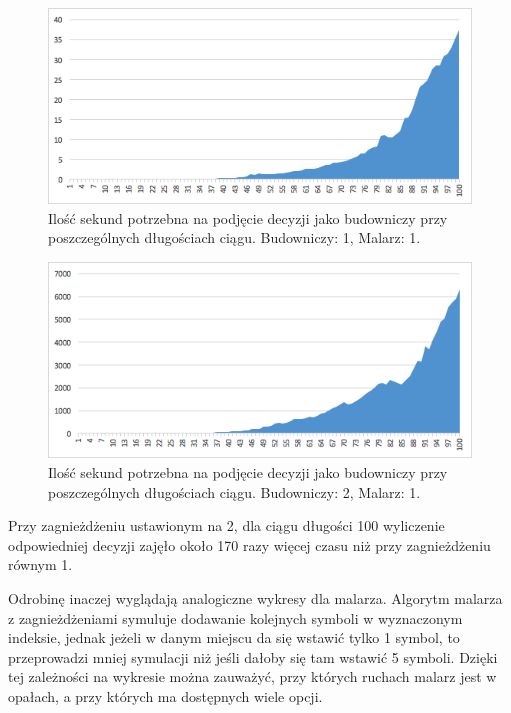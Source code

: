 \documentclass[document]{xmgr}
\begin{document}
\begin{figure}[h]
    \centering
    \includegraphics[scale = 0.7]{images/timeBuilder1Painter1}
    \caption{Ilość sekund potrzebna na podjęcie decyzji jako budowniczy przy poszczególnych długościach ciągu. Budowniczy: 1, Malarz: 1.}
    \label{fig:builder1painter1}
\end{figure}

\begin{figure}[H]
    \centering
    \includegraphics[scale = 0.7]{images/timeBuilder2Painter1}
    \caption{Ilość sekund potrzebna na podjęcie decyzji jako budowniczy przy poszczególnych długościach ciągu. Budowniczy: 2, Malarz: 1.}
    \label{fig:builder2painter1}
\end{figure}

Przy zagnieżdżeniu ustawionym na 2, dla ciągu długości 100 wyliczenie odpowiedniej decyzji zajęło około 170 razy więcej czasu niż przy zagnieżdżeniu równym 1.

Odrobinę inaczej wyglądają analogiczne wykresy dla malarza. Algorytm malarza z zagnieżdżeniami symuluje dodawanie kolejnych symboli w wyznaczonym indeksie, jednak jeżeli w danym miejscu da się wstawić tylko 1 symbol, to przeprowadzi mniej symulacji niż jeśli dałoby się tam wstawić 5 symboli. Dzięki tej zależności na wykresie można zauważyć, przy których ruchach malarz jest w opałach, a przy których ma dostępnych wiele opcji.
\end{document}
